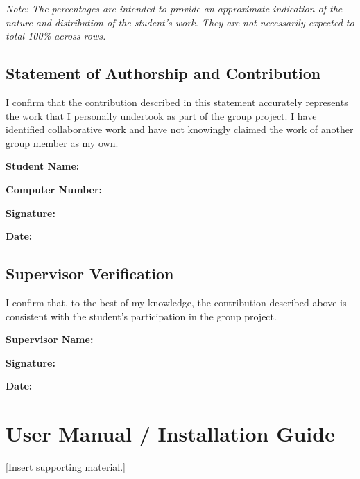 \documentclass[12pt,a4paper]{report}
\begin{document}
\noindent
\textit{Note: The percentages are intended to provide an approximate indication of the nature and distribution of the student's work. They are not necessarily expected to total 100\% across rows.}

\section{Statement of Authorship and Contribution}

I confirm that the contribution described in this statement accurately represents the work that I personally undertook as part of the group project. I have identified collaborative work and have not knowingly claimed the work of another group member as my own.

\vspace{1cm}

\noindent\textbf{Student Name:} \hrulefill

\vspace{0.5cm}

\noindent\textbf{Computer Number:} \hrulefill

\vspace{0.5cm}

\noindent\textbf{Signature:} \hrulefill

\vspace{0.5cm}

\noindent\textbf{Date:} \hrulefill
\newpage
\section{Supervisor Verification}

I confirm that, to the best of my knowledge, the contribution described above is consistent with the student's participation in the group project.

\vspace{1cm}

\noindent\textbf{Supervisor Name:} \hrulefill

\vspace{0.5cm}

\noindent\textbf{Signature:} \hrulefill

\vspace{0.5cm}

\noindent\textbf{Date:} \hrulefill

\chapter{User Manual / Installation Guide}
[Insert supporting material.]
\end{document}
